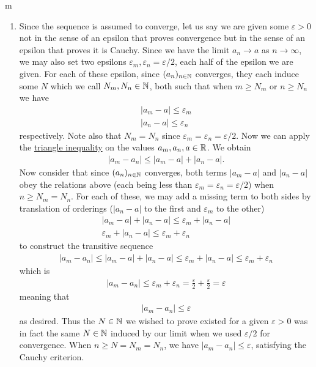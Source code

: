 \documentclass[11pt]{article}
\begin{document}
\begin{my proof}{m}
\begin{enumerate}
\item Since the sequence is assumed to converge, let us say we are given some $\varepsilon > 0$ not in the sense of an epsilon that proves convergence but in the sense of an epsilon that proves it is Cauchy. Since we have the limit $a_n \to a$ as $n \to \infty$, we may also set two epsilons $\varepsilon_m,\varepsilon_n = \varepsilon/2$, each half of the epsilon we are given. For each of these epsilon, since $(a_n)_{n\in \mathbb{N}}$ converges, they each induce some $N$ which we call $N_m, N_n \in \mathbb{N}$, both such that when $m \ge N_m$ or $n \ge N_n$ we have \begin{gather*}
|a_m - a| \le \varepsilon_m \\
|a_n - a| \le \varepsilon_n
\end{gather*}
respectively. Note also that $N_m = N_n$ since $\varepsilon_m = \varepsilon_n = \varepsilon/2$. Now we can apply the \hyperref[thm:RTriangleInequality]{triangle inequality} on the values $a_m, a_n, a \in \mathbb{R}$. We obtain \begin{gather*}
|a_m - a_n| \le |a_m - a| + |a_n - a|.
\end{gather*}
Now consider that since $(a_n)_{n\in \mathbb{N}}$ converges, both terms $|a_m - a|$ and $|a_n - a|$ obey the relations above (each being less than $\varepsilon_m = \varepsilon_n = \varepsilon/2$) when $n \ge N_m = N_n$. For each of these, we may add a missing term to both sides by translation of orderings ($|a_n - a|$ to the first and $\varepsilon_m$ to the other) \begin{gather*}
|a_m - a| + |a_n - a| \le \varepsilon_m + |a_n - a| \\
\varepsilon_m + |a_n - a| \le \varepsilon_m + \varepsilon_n
\end{gather*}
to construct the transitive sequence \begin{gather*}
|a_m - a_n| \le |a_m - a| + |a_n - a| \le \varepsilon_m + |a_n - a| \le \varepsilon_m + \varepsilon_n
\end{gather*}
which is \begin{gather*}
|a_m - a_n| \le \varepsilon_m + \varepsilon_n = \frac{\varepsilon}{2} + \frac{\varepsilon}{2} = \varepsilon
\end{gather*}
meaning that \begin{gather*}
|a_m - a_n| \le \varepsilon
\end{gather*}
as desired. Thus the $N \in \mathbb{N}$ we wished to prove existed for a given $\varepsilon> 0$ was in fact the same $N \in \mathbb{N}$ induced by our limit when we used $\varepsilon/2$ for convergence. When $n \ge N = N_m = N_n$, we have $|a_m - a_n| \le \varepsilon$, satisfying the Cauchy criterion.
\end{enumerate}
\end{my proof}
\end{document}
